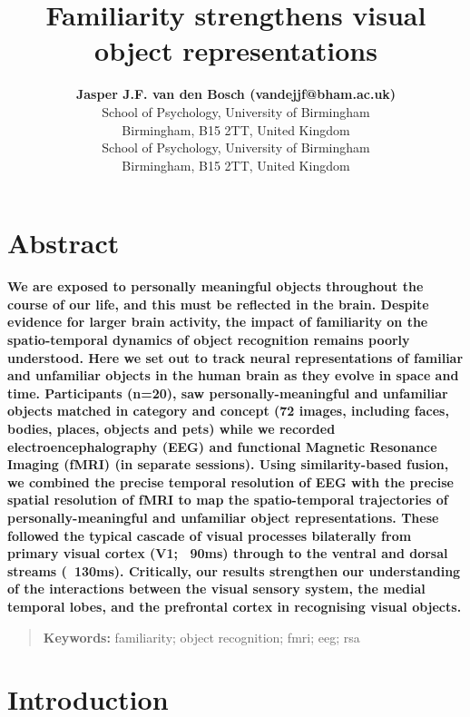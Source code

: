 \documentclass[10pt,letterpaper]{article}
\title{Familiarity strengthens visual object representations}
\author{{\large \bf Jasper J.F. van den Bosch (vandejjf@bham.ac.uk)} \\
  School of Psychology, University of Birmingham\\
  Birmingham, B15 2TT, United Kingdom
  \AND {\large \bf Ian Charest (charesti@bham.ac.uk)} \\
  School of Psychology, University of Birmingham\\
  Birmingham, B15 2TT, United Kingdom}
\begin{document}
\maketitle


\section{Abstract}
{
\bf
We are exposed to personally meaningful objects throughout the 
course of our life, and this must  be reflected in the brain. 
Despite evidence for larger brain activity, the impact of 
familiarity on the spatio-temporal dynamics of object recognition 
remains poorly understood. Here we set out to track neural 
representations of familiar and unfamiliar objects in the human 
brain as they evolve in space and time. Participants (n=20), 
saw personally-meaningful and unfamiliar objects matched in 
category and concept (72 images, including faces, bodies, 
places, objects and pets) while we recorded electroencephalography 
(EEG) and functional Magnetic Resonance Imaging (fMRI) (in separate 
sessions). Using similarity-based fusion, we combined the precise 
temporal resolution of EEG with the precise spatial resolution of 
fMRI to map the spatio-temporal trajectories of personally-meaningful 
and unfamiliar object representations. These followed the typical 
cascade of visual processes bilaterally from primary visual cortex 
(V1; ~90ms) through to the ventral and dorsal streams (~130ms). 
Critically, our results strengthen our understanding of the interactions 
between the visual sensory system, the medial temporal lobes, and 
the prefrontal cortex in recognising visual objects. 
}
\begin{quote}
\small
\textbf{Keywords:} 
familiarity; object recognition; fmri; eeg; rsa
\end{quote}

\section{Introduction}
\end{document}
